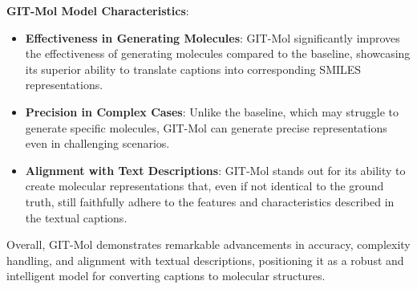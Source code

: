 \documentclass{article}
\begin{document}
\textbf{GIT-Mol Model Characteristics}:
\begin{itemize}
\item\textbf{Effectiveness in Generating Molecules}: GIT-Mol significantly improves the effectiveness of generating molecules compared to the baseline, showcasing its superior ability to translate captions into corresponding SMILES representations.
\item\textbf{Precision in Complex Cases}: Unlike the baseline, which may struggle to generate specific molecules, GIT-Mol can generate precise representations even in challenging scenarios.
\item\textbf{Alignment with Text Descriptions}: GIT-Mol stands out for its ability to create molecular representations that, even if not identical to the ground truth, still faithfully adhere to the features and characteristics described in the textual captions.
\end{itemize}

Overall, GIT-Mol demonstrates remarkable advancements in accuracy, complexity handling, and alignment with textual descriptions, positioning it as a robust and intelligent model for converting captions to molecular structures.
\end{document}
